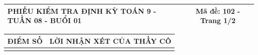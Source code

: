 \documentclass[12pt,a4paper]{article}
\begin{document}
\newpage

\noindent
\begin{tabularx}{\linewidth}{|X|c|}
\hline
\textbf{PHIẾU KIỂM TRA ĐỊNH KỲ TOÁN 9 - TUẦN 08 - BUỔI 01} & \textbf{Mã đề: 102 - Trang 1/2} \\
\hline
\end{tabularx}

\vspace{1.0mm}

\noindent
\begin{tabularx}{\linewidth}{|p{3.2cm}|X|}
\hline
\centering\textbf{ĐIỂM SỐ} & \centering\textbf{LỜI NHẬN XÉT CỦA THẦY CÔ} \tabularnewline
\hline
\rule{0pt}{1.8cm} & \tabularnewline
\hline
\end{tabularx}
\end{document}
